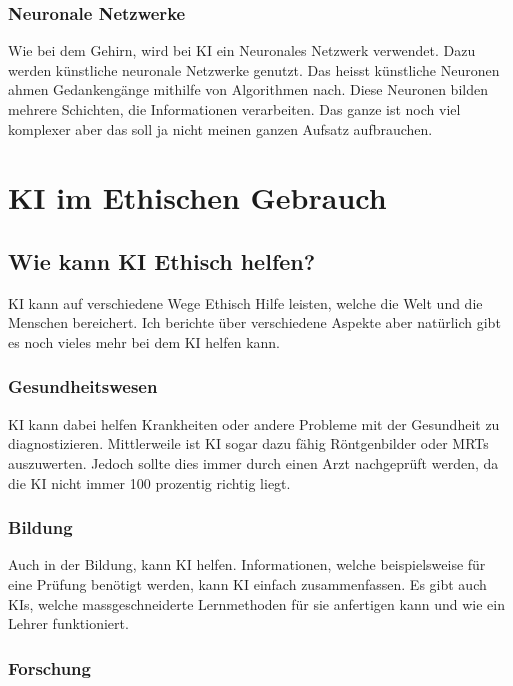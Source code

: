 \documentclass{report}
\begin{document}
\subsection{Neuronale Netzwerke}

Wie bei dem Gehirn, wird bei KI ein Neuronales Netzwerk verwendet. Dazu werden künstliche neuronale Netzwerke genutzt. Das heisst künstliche Neuronen ahmen Gedankengänge mithilfe von Algorithmen nach. Diese Neuronen bilden mehrere Schichten, die Informationen verarbeiten. Das ganze ist noch viel komplexer aber das soll ja nicht meinen ganzen Aufsatz aufbrauchen.

\chapter{KI im Ethischen Gebrauch}

\section{Wie kann KI Ethisch helfen?}

KI kann auf verschiedene Wege Ethisch Hilfe leisten, welche die Welt und die Menschen bereichert. Ich berichte über verschiedene Aspekte aber natürlich gibt es noch vieles mehr bei dem KI helfen kann.

\subsection{Gesundheitswesen}

KI kann dabei helfen Krankheiten oder andere Probleme mit der Gesundheit zu diagnostizieren. Mittlerweile ist KI sogar dazu fähig Röntgenbilder oder MRTs auszuwerten. Jedoch sollte dies immer durch einen Arzt nachgeprüft werden, da die KI nicht immer 100 prozentig richtig liegt. 

\subsection{Bildung}

Auch in der Bildung, kann KI helfen. Informationen, welche beispielsweise für eine Prüfung benötigt werden, kann KI einfach zusammenfassen. Es gibt auch KIs, welche massgeschneiderte Lernmethoden für sie anfertigen kann und wie ein Lehrer funktioniert. 

\subsection{Forschung}
\end{document}
